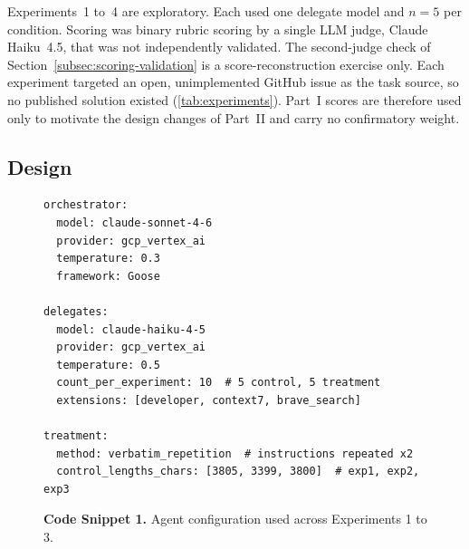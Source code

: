 \documentclass[11pt,a4paper]{article}
\begin{document}
Experiments~1 to~4 are exploratory.
Each used one delegate model and $n{=}5$ per condition.
Scoring was binary rubric scoring by a single LLM judge, Claude Haiku~4.5, that was not independently validated. The second-judge check of Section~\ref{subsec:scoring-validation} is a score-reconstruction exercise only.
Each experiment targeted an open, unimplemented GitHub issue as the task source, so no published solution existed (\autoref{tab:experiments}).
Part~I scores are therefore used only to motivate the design changes of Part~II and carry no confirmatory weight.

\subsection{Design}
\label{subsec:design13}
\label{sec:preregistration}

\begin{figure}[h]
\centering
\captionsetup{labelformat=empty,justification=raggedright,singlelinecheck=false}
\caption{\small \textbf{Code Snippet 1.} Agent configuration used across Experiments 1 to 3.}
\label{lst:config}
\begin{lstlisting}
orchestrator:
  model: claude-sonnet-4-6
  provider: gcp_vertex_ai
  temperature: 0.3
  framework: Goose

delegates:
  model: claude-haiku-4-5
  provider: gcp_vertex_ai
  temperature: 0.5
  count_per_experiment: 10  # 5 control, 5 treatment
  extensions: [developer, context7, brave_search]

treatment:
  method: verbatim_repetition  # instructions repeated x2
  control_lengths_chars: [3805, 3399, 3800]  # exp1, exp2, exp3
\end{lstlisting}
\end{figure}\addtocounter{figure}{-1}
\end{document}
